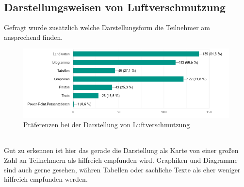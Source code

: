 \subsection{Darstellungsweisen von Luftverschmutzung}
Gefragt wurde zusätzlich welche Darstellungsform die Teilnehmer am ansprechend finden.
\\
\begin{figure}[h]
    \centering
    \includegraphics[width=1\textwidth]{media/diagram/darstellung.png}
    \caption{Präferenzen bei der Darstellung von Luftverschmutzung}
\end{figure}
\\
Gut zu erkennen ist hier das gerade die Darstellung als Karte von einer großen Zahl an Teilnehmern als hilfreich empfunden wird.
Graphiken und Diagramme sind auch gerne gesehen, währen Tabellen oder sachliche Texte als eher weniger hilfreich empfunden werden.
